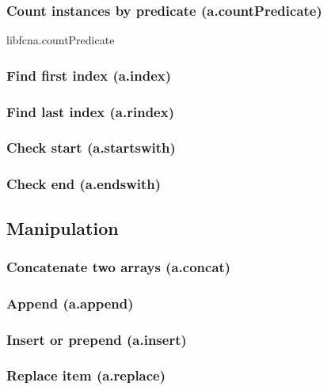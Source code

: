 \documentclass{article}
\theoremstyle{definition}
\begin{document}
\subsubsection{Count instances by predicate (a.countPredicate)}
libfcn{a.countPredicate}

\subsubsection{Find first index (a.index)}

\subsubsection{Find last index (a.rindex)}

\subsubsection{Check start (a.startswith)}

\subsubsection{Check end (a.endswith)}

\subsection{Manipulation}

\subsubsection{Concatenate two arrays (a.concat)}

\subsubsection{Append (a.append)}

\subsubsection{Insert or prepend (a.insert)}

\subsubsection{Replace item (a.replace)}
\end{document}
